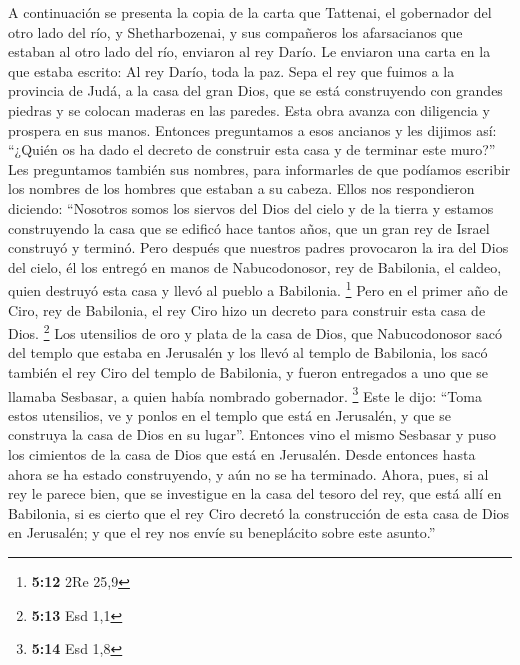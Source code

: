 \begin{paracol}{2}
 A continuación se presenta la copia de la carta que
Tattenai, el gobernador del otro lado del río, y Shetharbozenai, y sus
compañeros los afarsacianos que estaban al otro lado del río, enviaron
al rey Darío.  Le enviaron una carta en la que estaba
escrito: Al rey Darío, toda la paz.  Sepa el rey que
fuimos a la provincia de Judá, a la casa del gran Dios, que se está
construyendo con grandes piedras y se colocan maderas en las paredes.
Esta obra avanza con diligencia y prospera en sus manos. 
Entonces preguntamos a esos ancianos y les dijimos así: ``¿Quién os ha
dado el decreto de construir esta casa y de terminar este muro?''
 Les preguntamos también sus nombres, para informarles de
que podíamos escribir los nombres de los hombres que estaban a su
cabeza.  Ellos nos respondieron diciendo: ``Nosotros
somos los siervos del Dios del cielo y de la tierra y estamos
construyendo la casa que se edificó hace tantos años, que un gran rey de
Israel construyó y terminó.  Pero después que nuestros
padres provocaron la ira del Dios del cielo, él los entregó en manos de
Nabucodonosor, rey de Babilonia, el caldeo, quien destruyó esta casa y
llevó al pueblo a Babilonia. \footnote{\textbf{5:12} 2Re 25,9}
 Pero en el primer año de Ciro, rey de Babilonia, el rey
Ciro hizo un decreto para construir esta casa de Dios. \footnote{\textbf{5:13}
  Esd 1,1}  Los utensilios de oro y plata de la casa de
Dios, que Nabucodonosor sacó del templo que estaba en Jerusalén y los
llevó al templo de Babilonia, los sacó también el rey Ciro del templo de
Babilonia, y fueron entregados a uno que se llamaba Sesbasar, a quien
había nombrado gobernador. \footnote{\textbf{5:14} Esd 1,8}
 Este le dijo: ``Toma estos utensilios, ve y ponlos en el
templo que está en Jerusalén, y que se construya la casa de Dios en su
lugar''.  Entonces vino el mismo Sesbasar y puso los
cimientos de la casa de Dios que está en Jerusalén. Desde entonces hasta
ahora se ha estado construyendo, y aún no se ha terminado.
 Ahora, pues, si al rey le parece bien, que se investigue
en la casa del tesoro del rey, que está allí en Babilonia, si es cierto
que el rey Ciro decretó la construcción de esta casa de Dios en
Jerusalén; y que el rey nos envíe su beneplácito sobre este asunto.''

\switchcolumn
\begin{otherlanguage}{english}

\hypertarget{favorable-prophecies-of-two-prophets-governors-permission-to-resume-construction}{%
}
\end{otherlanguage}
\end{paracol}
